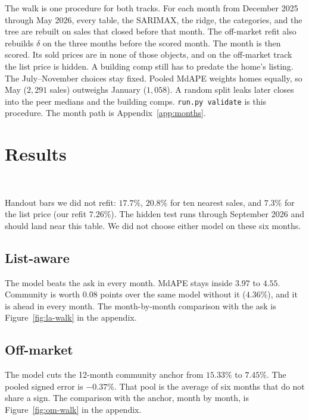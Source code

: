 \documentclass[11pt]{article}
\begin{document}
The walk is one procedure for both tracks. For each month from December 2025 through May 2026, every table, the SARIMAX, the ridge, the categories, and the tree are rebuilt on sales that closed before that month. The off-market refit also rebuilds \(\delta\) on the three months before the scored month. The month is then scored. Its sold prices are in none of those objects, and on the off-market track the list price is hidden. A building comp still has to predate the home's listing. The July--November choices stay fixed. Pooled MdAPE weights homes equally, so May (\(2{,}291\) sales) outweighs January (\(1{,}058\)). A random split leaks later closes into the peer medians and the building comps. \texttt{run.py validate} is this procedure. The month path is Appendix~\ref{app:months}.

\section{Results}

\begin{center}
\\[2pt]
\end{center}

Handout bars we did not refit: \(17.7\%\), \(20.8\%\) for ten nearest sales, and \(7.3\%\) for the list price (our refit \(7.26\%\)). The hidden test runs through September 2026 and should land near this table. We did not choose either model on these six months.

\subsection{List-aware}

The model beats the ask in every month. MdAPE stays inside \(3.97\) to \(4.55\). Community is worth \(0.08\) points over the same model without it (\(4.36\%\)), and it is ahead in every month. The month-by-month comparison with the ask is Figure~\ref{fig:la-walk} in the appendix.

\subsection{Off-market}

The model cuts the 12-month community anchor from \(15.33\%\) to \(7.45\%\). The pooled signed error is \(-0.37\%\). That pool is the average of six months that do not share a sign. The comparison with the anchor, month by month, is Figure~\ref{fig:om-walk} in the appendix.
\end{document}
